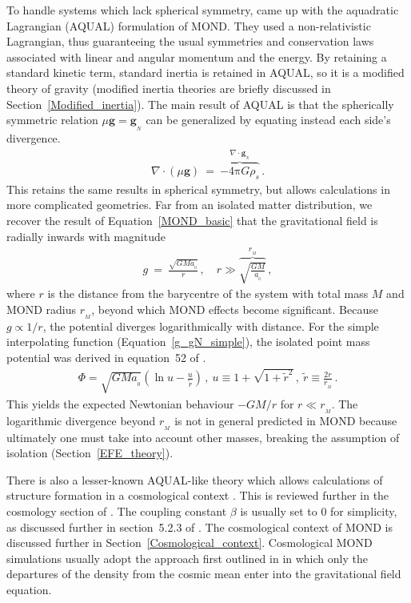 \documentclass[fleqn,usenatbib,useAMS]{mnras} %
\begin{document}
To handle systems which lack spherical symmetry, \citet{Bekenstein_Milgrom_1984} came up with the aquadratic Lagrangian (AQUAL) formulation of MOND. They used a non-relativistic Lagrangian, thus guaranteeing the usual symmetries and conservation laws associated with linear and angular momentum and the energy. By retaining a standard kinetic term, standard inertia is retained in AQUAL, so it is a modified theory of gravity (modified inertia theories are briefly discussed in Section~\ref{Modified_inertia}). The main result of AQUAL is that the spherically symmetric relation $\mu \bm{g} = \bm{g}_{_N}$ can be generalized by equating instead each side's divergence.
\begin{eqnarray}
	\nabla \cdot \left( \mu \bm{g} \right) ~=~ \overbrace{-4 \mathrm{\pi}  G \rho_s}^{\nabla \cdot \bm{g}_{_N}} \, .
	\label{Governing_equation_AQUAL}
\end{eqnarray}
This retains the same results in spherical symmetry, but allows calculations in more complicated geometries. Far from an isolated matter distribution, we recover the result of Equation~\ref{MOND_basic} that the gravitational field is radially inwards with magnitude
\begin{eqnarray}
	g ~=~ \frac{\sqrt{GMa_{_0}}}{r} \, , \quad r \gg \overbrace{\sqrt{\frac{GM}{a_{_0}}}}^{r_{_M}} \, ,
	\label{Point_mass_force_law_DML}
 \end{eqnarray}
where $r$ is the distance from the barycentre of the system with total mass $M$ and MOND radius $r_{_M}$, beyond which MOND effects become significant. Because $g \propto 1/r$, the potential diverges logarithmically with distance. For the simple interpolating function (Equation~\ref{g_gN_simple}), the isolated point mass potential was derived in equation~52 of \citet*{Banik_Ryan_2018}.
\begin{eqnarray}
	\Phi = \sqrt{GMa_{_0}} \left( \ln u - \frac{u}{\widetilde{r}} \right) \, , ~ u \equiv 1 + \sqrt{1 + {\widetilde{r}}^2} \, , ~ \widetilde{r} \equiv \frac{2r}{r_{_M}} \, .
	\label{Phi_point_simple}
\end{eqnarray}
This yields the expected Newtonian behaviour $-GM/r$ for $r \ll r_{_M}$. The logarithmic divergence beyond $r_{_M}$ is not in general predicted in MOND because ultimately one must take into account other masses, breaking the assumption of isolation (Section~\ref{EFE_theory}).

There is also a lesser-known AQUAL-like theory which allows calculations of structure formation in a cosmological context \citep{Sanders_2001}. This is reviewed further in the cosmology section of \citet{Sanders_2002}. The coupling constant $\beta$ is usually set to 0 for simplicity, as discussed further in section~5.2.3 of \citet*{Haslbauer_2020}. The cosmological context of MOND is discussed further in Section~\ref{Cosmological_context}. Cosmological MOND simulations usually adopt the approach first outlined in \citet{Nusser_2002} in which only the departures of the density from the cosmic mean enter into the gravitational field equation.
\end{document}
